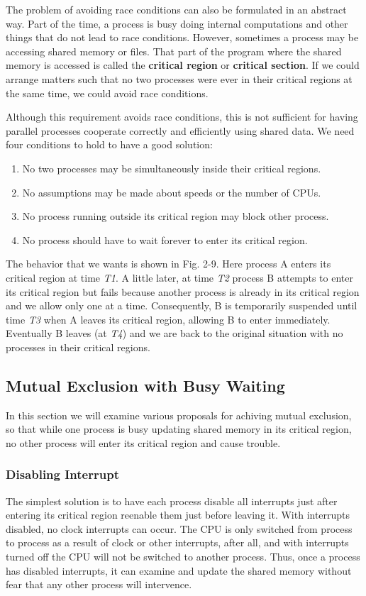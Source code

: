 \documentclass{book}
\newcommand {\kw}  [1] {\textbf{#1}}
\newcommand {\sys} [1] {\textsl{#1}}
\begin{document}
The problem of avoiding race conditions can also be formulated in an abstract way.
Part of the time, a process is busy doing internal computations and other things that do not lead to race conditions.
However, sometimes a process may be accessing shared memory or files.
That part of the program where the shared memory is accessed is called the \kw{critical region} or \kw{critical section}.
If we could arrange matters such that no two processes were ever in their critical regions at the same time, we could avoid race conditions.

Although this requirement avoids race conditions, 
this is not sufficient for having parallel processes cooperate correctly and efficiently using shared data.
We need four conditions to hold to have a good solution:
\begin{enumerate}
  \item No two processes may be simultaneously inside their critical regions.
  \item No assumptions may be made about speeds or the number of CPUs.
  \item No process running outside its critical region may block other process.
  \item No process should have to wait forever to enter its critical region.
\end{enumerate}

The behavior that we wants is shown in Fig. 2-9.
Here process A enters its critical region at time \sys{T1}.
A little later, at time \sys{T2} process B attempts to enter its critical region but fails 
because another process is already in its critical region and we allow only one at a time.
Consequently, B is temporarily suspended until time \sys{T3} when A leaves its critical region, allowing B to enter immediately.
Eventually B leaves (at \sys{T4}) and we are back to the original situation with no processes in their critical regions.

\subsection{Mutual Exclusion with Busy Waiting}
In this section we will examine various proposals for achiving mutual exclusion,
so that while one process is busy updating shared memory in its critical region,
no other process will enter its critical region and cause trouble.
\subsubsection*{Disabling Interrupt}
The simplest solution is to have each process disable all interrupts just after entering its critical region 
reenable them just before leaving it.
With interrupts disabled, no clock interrupts can occur.
The CPU is only switched from process to process as a result of clock or other interrupts, after all,
and with interrupts turned off the CPU will not be switched to another process.
Thus, once a process has disabled interrupts, it can examine and update the shared memory without fear that any other process will intervence.
\end{document}

